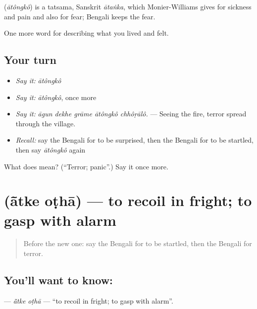 \begin{cousinweb}
\textbf{} (\emph{ātôngkô}) is a tatsama, Sanskrit \emph{ātaṅka}, which Monier-Williams gives for sickness and pain and also for fear; Bengali keeps the fear.
\end{cousinweb}

\begin{grammarlens}[title={What you've built}]
One more word for describing what you lived and felt.
\end{grammarlens}

\subsection*{Your turn}
\begin{itemize}
\raggedright
  \item \emph{Say it:} \emph{ātôngkô}
  \item \emph{Say it:} \emph{ātôngkô}, once more
  \item \emph{Say it:} \emph{āgun dekhe grāme ātôngkô chhôṛālô.} — Seeing the fire, terror spread through the village.
  \item \emph{Recall:} say the Bengali for to be surprised, then the Bengali for to be startled, then say \emph{ātôngkô} again
\end{itemize}

\begin{tcolorbox}[breakable,colback=teal!4,colframe=teal!35!black,title={Before you move on}]
What does  mean? (\textquotedblleft{}Terror; panic\textquotedblright{}.) Say it once more.
\end{tcolorbox}
\section[\texorpdfstring{\bn{আঁতকে} \bn{ওঠা} (ā̃tke oṭhā)}{আঁতকে ওঠা (ā̃tke oṭhā)}]{  (ā̃tke oṭhā) — to recoil in fright; to gasp with alarm}

\label{lesson:BN-C441-atke-otha}



\begin{quote}
Before the new one: say the Bengali for to be startled, then the Bengali for terror.
\end{quote}

\subsection*{You'll want to know:  }
\textbf{ } — \emph{ā̃tke oṭhā} — \textquotedblleft{}to recoil in fright; to gasp with alarm\textquotedblright{}.


